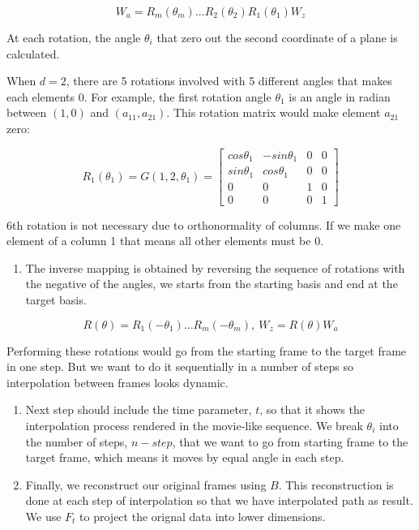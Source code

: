 \[ W_a = R_m(\theta_m) ... R_2(\theta_2)R_1(\theta_1)W_z\]

At each rotation, the angle \(\theta_i\) that zero out the second
coordinate of a plane is calculated.

When \(d = 2\), there are 5 rotations involved with 5 different angles
that makes each elements 0. For example, the first rotation angle
\(\theta_1\) is an angle in radian between \((1, 0)\) and
\((a_{11}, a_{21})\). This rotation matrix would make element \(a_{21}\)
zero:

\[R_1(\theta_1) = G(1, 2, \theta_1) = \begin{bmatrix} cos\theta_1 & -sin\theta_1 & 0 & 0 \\sin\theta_1  &cos\theta_1 & 0 &0 \\ 0&0&1&0 \\0&0&0&1\end{bmatrix}\]

6th rotation is not necessary due to orthonormality of columns. If we
make one element of a column 1 that means all other elements must be 0.

\begin{enumerate}
\def\labelenumi{\arabic{enumi}.}
\setcounter{enumi}{3}
\tightlist
\item
  The inverse mapping is obtained by reversing the sequence of rotations
  with the negative of the angles, we starts from the starting basis and
  end at the target basis.
\end{enumerate}

\[R(\theta) = R_1(-\theta_1) ... R_m(-\theta_m), \    W_z = R(\theta)W_a\]

Performing these rotations would go from the starting frame to the
target frame in one step. But we want to do it sequentially in a number
of steps so interpolation between frames looks dynamic.

\begin{enumerate}
\def\labelenumi{\arabic{enumi}.}
\setcounter{enumi}{4}
\item
  Next step should include the time parameter, \(t\), so that it shows
  the interpolation process rendered in the movie-like sequence. We
  break \(\theta_i\) into the number of steps, \(n-step\), that we want
  to go from starting frame to the target frame, which means it moves by
  equal angle in each step.
\item
  Finally, we reconstruct our original frames using \(B\). This
  reconstruction is done at each step of interpolation so that we have
  interpolated path as result. We use \(F_t\) to project the orignal
  data into lower dimensions.
\end{enumerate}

